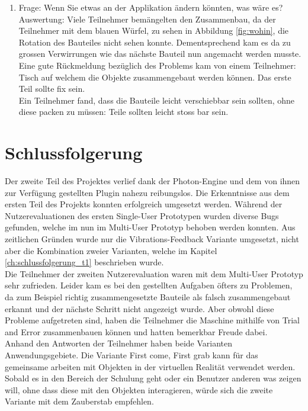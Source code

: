 \begin{enumerate} [itemsep=1pt,topsep=0pt]
	\item Frage: Wenn Sie etwas an der Applikation ändern könnten, was wäre es? \\
	Auswertung: Viele Teilnehmer bemängelten den Zusammenbau, da der Teilnehmer mit dem blauen Würfel, zu sehen in Abbildung \ref{fig:wohin}, die Rotation des Bauteiles nicht sehen konnte. Dementsprechend kam es da zu grossen Verwirrungen wie das nächste Bauteil nun angemacht werden musste. Eine gute Rückmeldung bezüglich des Problems kam von einem Teilnehmer: \grqq Tisch auf welchem die Objekte zusammengebaut werden können. Das erste Teil sollte fix sein.\grqq{} \\
	Ein Teilnehmer fand, dass die Bauteile leicht verschiebbar sein sollten, ohne diese packen zu müssen: \grqq Teile sollten leicht stoss bar sein.\grqq{}
\end{enumerate}

\section{Schlussfolgerung}

Der zweite Teil des Projektes verlief dank der Photon-Engine und dem von ihnen zur Verfügung gestellten Plugin nahezu reibungslos. Die Erkenntnisse aus dem ersten Teil des Projekts konnten erfolgreich umgesetzt werden. Während der Nutzerevaluationen des ersten Single-User Prototypen wurden diverse Bugs gefunden, welche im nun im Multi-User Prototyp behoben werden konnten. Aus zeitlichen Gründen wurde nur die Vibrations-Feedback Variante umgesetzt, nicht aber die Kombination zweier Varianten, welche im Kapitel \ref{ch:schlussfolgerung_t1} beschrieben wurde. \\

\noindent Die Teilnehmer der zweiten Nutzerevaluation waren mit dem Multi-User Prototyp sehr zufrieden. Leider kam es bei den gestellten Aufgaben öfters zu Problemen, da zum Beispiel richtig zusammengesetzte Bauteile als falsch zusammengebaut erkannt und der nächste Schritt nicht angezeigt wurde. Aber obwohl diese Probleme aufgetreten sind, haben die Teilnehmer die Maschine mithilfe von \grqq Trial and Error\grqq{} zusammenbauen können und hatten bemerkbar Freude dabei. \\

\noindent Anhand den Antworten der Teilnehmer haben beide Varianten Anwendungsgebiete. Die Variante \grqq First come, First grab\grqq{} kann für das gemeinsame arbeiten mit Objekten in der virtuellen Realität verwendet werden. Sobald es in den Bereich der Schulung geht oder ein Benutzer anderen was zeigen will, ohne dass diese mit den Objekten interagieren, würde sich die zweite Variante mit dem Zauberstab empfehlen.

